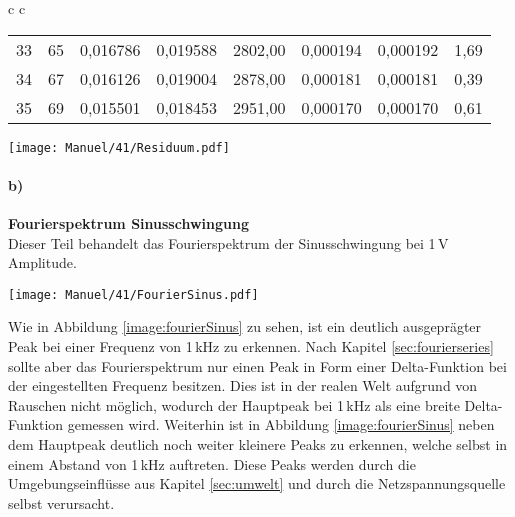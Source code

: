 \begin{center}
\begin{tabular}{c c}
\begin{tabular}{l | c | c c r | c c r}
            33 &      65 &  0,016786 &  0,019588 & 2802,00 & 0,000194 &  0,000192 &    1,69 \\
            34 &      67 &  0,016126 &  0,019004 & 2878,00 & 0,000181 &  0,000181 &    0,39 \\
            35 &      69 &  0,015501 &  0,018453 & 2951,00 & 0,000170 &  0,000170 &    0,61 \\
        \end{tabular}
    \end{tabular}    
    \label{tab:fourierkoeff}
\end{center}
\begin{center}
    \texttt{[image: Manuel/41/Residuum.pdf]}
    \label{image:residuum}
\end{center}


\newpage
\paragraph{b)}\textbf{Fourierspektrum Sinusschwingung}\\
Dieser Teil behandelt das Fourierspektrum der Sinusschwingung bei 1\,V Amplitude.
\begin{center}
    \texttt{[image: Manuel/41/FourierSinus.pdf]}
    \label{image:fourierSinus}
\end{center}
Wie in Abbildung \ref{image:fourierSinus} zu sehen, ist ein deutlich ausgeprägter Peak bei einer Frequenz von 1\,kHz zu erkennen. Nach Kapitel \ref{sec:fourierseries} sollte aber das Fourierspektrum nur einen Peak in Form einer Delta-Funktion bei der eingestellten Frequenz besitzen. Dies ist in der realen Welt aufgrund von Rauschen nicht möglich, wodurch der Hauptpeak bei 1\,kHz als eine breite Delta-Funktion gemessen wird. Weiterhin ist in Abbildung \ref{image:fourierSinus} neben dem Hauptpeak deutlich noch weiter kleinere Peaks zu erkennen, welche selbst in einem Abstand von 1\,kHz auftreten. Diese Peaks werden durch die Umgebungseinflüsse aus Kapitel \ref{sec:umwelt} und durch die Netzspannungsquelle selbst verursacht.


\newpage
